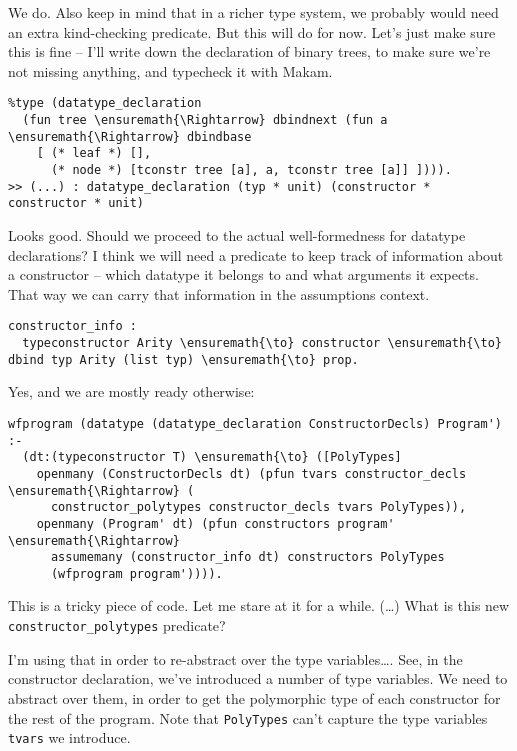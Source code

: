 \heroADVISOR{} We do. Also keep in mind that in a richer type system, we
probably would need an extra kind-checking predicate. But this will do
for now. Let's just make sure this is fine -- I'll write down the
declaration of binary trees, to make sure we're not missing anything,
and typecheck it with Makam.

\begin{verbatim}
%type (datatype_declaration
  (fun tree \ensuremath{\Rightarrow} dbindnext (fun a \ensuremath{\Rightarrow} dbindbase
    [ (* leaf *) [],
      (* node *) [tconstr tree [a], a, tconstr tree [a]] ]))).
>> (...) : datatype_declaration (typ * unit) (constructor * constructor * unit)
\end{verbatim}

\heroSTUDENT{} Looks good. Should we proceed to the actual well-formedness for
datatype declarations? I think we will need a predicate to keep track of
information about a constructor -- which datatype it belongs to and what
arguments it expects. That way we can carry that information in the
assumptions context.

\begin{verbatim}
constructor_info :
  typeconstructor Arity \ensuremath{\to} constructor \ensuremath{\to} dbind typ Arity (list typ) \ensuremath{\to} prop.
\end{verbatim}

\heroADVISOR{} Yes, and we are mostly ready otherwise:

\begin{verbatim}
wfprogram (datatype (datatype_declaration ConstructorDecls) Program') :-
  (dt:(typeconstructor T) \ensuremath{\to} ([PolyTypes]
    openmany (ConstructorDecls dt) (pfun tvars constructor_decls \ensuremath{\Rightarrow} (
      constructor_polytypes constructor_decls tvars PolyTypes)),
    openmany (Program' dt) (pfun constructors program' \ensuremath{\Rightarrow}
      assumemany (constructor_info dt) constructors PolyTypes
      (wfprogram program')))).
\end{verbatim}

\heroSTUDENT{} This is a tricky piece of code. Let me stare at it for a while.
(\ldots{}) What is this new \texttt{constructor\_polytypes} predicate?

\heroADVISOR{} I'm using that in order to re-abstract over the type
variables\ldots{}. See, in the constructor declaration, we've introduced
a number of type variables. We need to abstract over them, in order to
get the polymorphic type of each constructor for the rest of the
program. Note that \texttt{PolyTypes} can't capture the type variables
\texttt{tvars} we introduce.

